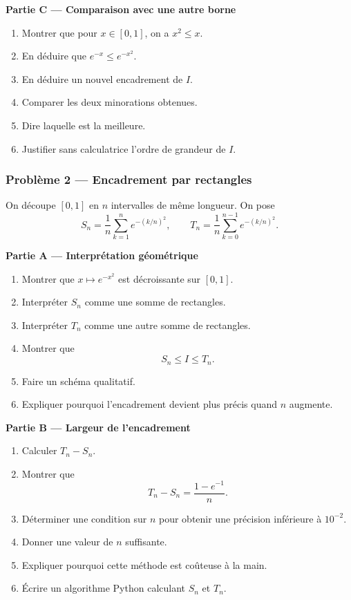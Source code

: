 \documentclass[11pt,a4paper]{article}
\begin{document}
\begin{difficile}
\textbf{Partie C — Comparaison avec une autre borne}
\begin{enumerate}
  \item Montrer que pour $x\in[0,1]$, on a $x^2\leq x$.
  \item En déduire que $e^{-x}\leq e^{-x^2}$.
  \item En déduire un nouvel encadrement de $I$.
  \item Comparer les deux minorations obtenues.
  \item Dire laquelle est la meilleure.
  \item Justifier sans calculatrice l'ordre de grandeur de $I$.
\end{enumerate}

\subsubsection*{Problème 2 — Encadrement par rectangles}

On découpe $[0,1]$ en $n$ intervalles de même longueur. On pose
\[
S_n=\frac1n\sum_{k=1}^{n} e^{-(k/n)^2},
\qquad
T_n=\frac1n\sum_{k=0}^{n-1} e^{-(k/n)^2}.
\]

\textbf{Partie A — Interprétation géométrique}
\begin{enumerate}
  \item Montrer que $x\mapsto e^{-x^2}$ est décroissante sur $[0,1]$.
  \item Interpréter $S_n$ comme une somme de rectangles.
  \item Interpréter $T_n$ comme une autre somme de rectangles.
  \item Montrer que
  \[
  S_n\leq I\leq T_n.
  \]
  \item Faire un schéma qualitatif.
  \item Expliquer pourquoi l'encadrement devient plus précis quand $n$ augmente.
\end{enumerate}

\textbf{Partie B — Largeur de l'encadrement}
\begin{enumerate}
  \item Calculer $T_n-S_n$.
  \item Montrer que
  \[
  T_n-S_n=\frac{1-e^{-1}}{n}.
  \]
  \item Déterminer une condition sur $n$ pour obtenir une précision inférieure à $10^{-2}$.
  \item Donner une valeur de $n$ suffisante.
  \item Expliquer pourquoi cette méthode est coûteuse à la main.
  \item Écrire un algorithme Python calculant $S_n$ et $T_n$.
\end{enumerate}


\end{difficile}
\end{document}
